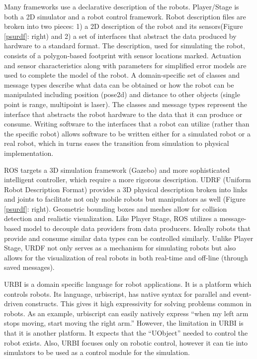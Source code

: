 Many frameworks use a declarative description of the robots.  Player/Stage \cite{vaughan2007} is both a 2D simulator and a robot control framework.  Robot description files are broken into two pieces: 1) a 2D description of the robot and its sensors(Figure \ref{psurdf}: right) and 2) a set of interfaces that abstract the data produced by hardware to a standard format.  The description, used for simulating the robot, consists of a polygon-based footprint with sensor locations marked. Actuation and sensor characteristics along with parameters for simplified error models are used to complete the model of the robot.  A domain-specific set of classes and message types describe what data can be obtained or how the robot can be manipulated including position (pose2d) and distance to other objects (single point is range, multipoint is laser).  The classes and message types represent the interface that abstracts the robot hardware to the data that it can produce or consume.  Writing software to the interfaces that a robot can utilize (rather than the specific robot) allows software to be written either for a simulated robot or a real robot, which in turns eases the transition from simulation to physical implementation.

ROS \cite{quigley2009} targets a 3D simulation framework (Gazebo) and more sophisticated intelligent controller, which require a more rigorous description.  UDRF (Uniform Robot Description Format) provides a 3D physical description broken into links and joints to facilitate not only mobile robots but manipulators as well (Figure \ref{psurdf}: right).  Geometric bounding boxes and meshes allow for collision detection and realistic visualization.  Like Player Stage, ROS utilizes a message-based model to decouple data providers from data producers.  Ideally robots that provide and consume similar data types can be controlled similarly.  Unlike Player Stage, URDF not only serves as a mechanism for simulating robots but also allows for the visualization of real robots in both real-time and off-line (through saved messages). 

URBI \cite{Baillie2005} is a domain specific language for robot applications. It is a platform which controls robots. Its language, urbiscript, has native syntax for parallel and event-driven constructs. This gives it high expressivity for solving problems common in robots. As an example, urbiscript can easily natively express ``when my left arm stops moving, start moving the right arm.'' However, the limitation in URBI is that it is another platform. It expects that the ``UObject'' needed to control the robot exists. Also, URBI focuses only on robotic control, however it can tie into simulators to be used as a control module for the simulation.

